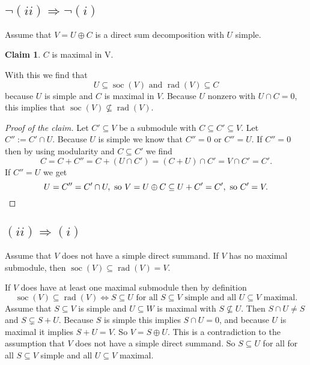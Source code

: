 \documentclass[a4paper,10pt]{article}
\theoremstyle{definition}
\newtheorem*{claim}{Claim}
\newcommand{\soc}{\operatorname{soc}}
\newcommand{\rad}{\operatorname{rad}}
\begin{document}
\subsection*{$\neg (ii) \Rightarrow \neg (i)$}
Assume that $V = U \oplus C$ is a direct sum decomposition with $U$ simple.
\begin{claim}
 $C$ is maximal in V.
\end{claim}
With this we find that
\[
 U \subseteq \soc(V) \text{ and } \rad(V) \subseteq C
\]
because $U$ is simple and $C$ is maximal in $V$. Because $U$ nonzero with $U \cap C = 0$, this implies that $\soc(V) \nsubseteq \rad(V)$.
\begin{proof}[Proof of the claim]
 Let $C' \subseteq V$ be a submodule with $C \subseteq C' \subseteq V$. Let $C'' := C'\!\cap U$. Because $U$ is simple we know that $C'' = 0$ or $C'' = U$. If $C'' = 0$ then by using modularity and $C \subseteq C'$ we find
 \[
  C = C + C'' = C + (U \cap C') = (C + U) \cap C' = V \cap C' = C'.
 \]
 If $C'' = U$ we get
 \[
  U = C'' = C' \cap U, \text{ so } V = U \oplus C \subseteq U + C' = C', \text{ so } C' = V. \qedhere
 \]
\end{proof}




\subsection*{$(ii) \Rightarrow (i)$}
Assume that $V$ does not have a simple direct summand. If $V$ has no maximal submodule, then $\soc(V) \subseteq \rad(V) = V$.

If $V$ does have at least one maximal submodule then by definition
\[
 \soc(V) \subseteq \rad(V) \Leftrightarrow S \subseteq U \text{ for all } S \subseteq V \text{ simple and all } U \subseteq V \text{ maximal}.
\]
Assume that $S \subseteq V$ is simple and $U \subseteq W$ is maximal with $S \nsubseteq U$. Then $S \cap U \neq S$ and $S \subsetneq S+U$. Because $S$ is simple this implies $S \cap U = 0$, and because $U$ is maximal it implies $S+U = V$. So $V = S \oplus U$. This is a contradiction to the assumption that $V$ does not have a simple direct summand. So $S \subseteq U$ for all for all $S \subseteq V$ simple and all $U \subseteq V$ maximal.





\section{}
\end{document}

